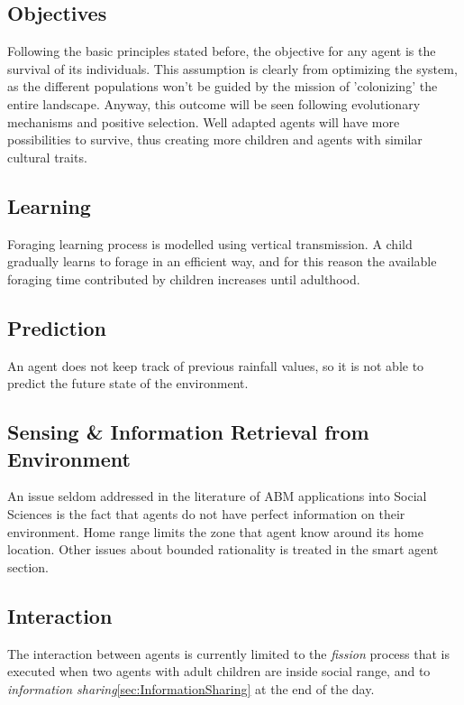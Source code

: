 \documentclass[11pt,oneside,a4paper,openright]{report}
\begin{document}
\subsection{Objectives}
Following the basic principles stated before, the objective for any agent is the survival of its individuals.
This assumption is clearly from optimizing the system, as the different populations won't be guided by
the mission of 'colonizing' the entire landscape. Anyway, this outcome will be seen following
evolutionary mechanisms and positive selection. Well adapted agents will have more possibilities to
survive, thus creating more children and agents with similar cultural traits.

\subsection{Learning}
Foraging learning process is modelled using vertical transmission. A child gradually learns to forage in
an efficient way, and for this reason the available foraging time contributed by children increases until
adulthood.
\subsection{Prediction}
An agent does not keep track of previous rainfall values, so it is not able to predict the future state of
the environment.
\subsection{Sensing \& Information Retrieval from Environment}
An issue seldom addressed in the literature of ABM applications into Social Sciences is the fact that
agents do not have perfect information on their environment. Home range limits the zone that agent
know around its home location. Other issues about bounded rationality is treated in the smart agent section.
 
\subsection{Interaction}
The interaction between agents is currently limited to the \emph{fission} process that is executed when two
agents with adult children are inside social range, and to \emph{information sharing}\ref{sec:InformationSharing} at the end of the day.
\end{document}
